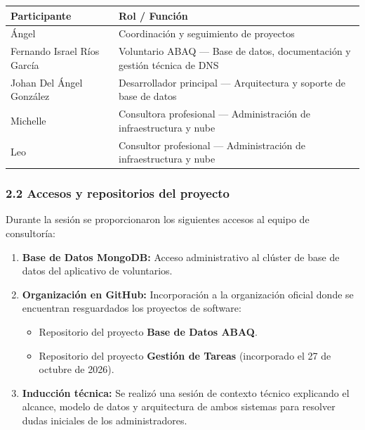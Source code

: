 \documentclass[
]{article}
\newcounter{none} %
\providecommand{\tightlist}{%
  \setlength{\itemsep}{0pt}\setlength{\parskip}{0pt}}
\begin{document}
{\def\LTcaptype{none} %
\begin{longtable}[]{@{}
  >{\raggedright\arraybackslash}p{}
  >{\raggedright\arraybackslash}p{}@{}}
\toprule\noalign{}
\begin{minipage}[b]{\linewidth}\raggedright
Participante
\end{minipage} & \begin{minipage}[b]{\linewidth}\raggedright
Rol / Función
\end{minipage} \\
\midrule\noalign{}
\endhead
\bottomrule\noalign{}
\endlastfoot
Ángel & Coordinación y seguimiento de proyectos \\
Fernando Israel Ríos García & Voluntario ABAQ --- Base de datos,
documentación y gestión técnica de DNS \\
Johan Del Ángel González & Desarrollador principal --- Arquitectura y
soporte de base de datos \\
Michelle & Consultora profesional --- Administración de infraestructura
y nube \\
Leo & Consultor profesional --- Administración de infraestructura y
nube \\
\end{longtable}
}

\subsubsection{2.2 Accesos y repositorios del
proyecto}\label{accesos-y-repositorios-del-proyecto}

Durante la sesión se proporcionaron los siguientes accesos al equipo de
consultoría:

\begin{enumerate}
\def\labelenumi{\arabic{enumi}.}
\tightlist
\item
  \textbf{Base de Datos MongoDB:} Acceso administrativo al clúster de
  base de datos del aplicativo de voluntarios.
\item
  \textbf{Organización en GitHub:} Incorporación a la organización
  oficial donde se encuentran resguardados los proyectos de software:

  \begin{itemize}
  \tightlist
  \item
    Repositorio del proyecto \textbf{Base de Datos ABAQ}.
  \item
    Repositorio del proyecto \textbf{Gestión de Tareas} (incorporado el
    27 de octubre de 2026).
  \end{itemize}
\item
  \textbf{Inducción técnica:} Se realizó una sesión de contexto técnico
  explicando el alcance, modelo de datos y arquitectura de ambos
  sistemas para resolver dudas iniciales de los administradores.
\end{enumerate}
\end{document}
